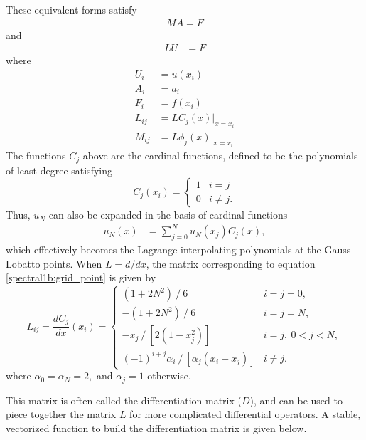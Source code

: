 These equivalent forms satisfy
\begin{align}
	MA = F \label{spectral1b:chebyshev_expansion}
\end{align}
and
\begin{align}
	LU &= F \label{spectral1b:grid_point}
\end{align}
where
\begin{align*}
	U_i &= u(x_i) \\
	A_i &= a_i \\
	F_i &= f(x_i) \\
	L_{ij} &= LC_j(x) \bigg |_{x=x_i} \\
	M_{ij} &= L\phi_j(x) \bigg |_{x=x_i}
\end{align*}
The functions $C_j$ above are the cardinal functions, defined to be the polynomials of least degree satisfying
\begin{equation*}
C_j(x_i) = \begin{cases} 1 & i=j \\ 0 & i \neq j.
   \end{cases}
\end{equation*}
Thus, $u_N$ can also be expanded in the basis of cardinal functions
\begin{align*}
	u_N(x) &= \sum_{j=0}^N u_N(x_j) C_j(x),
\end{align*}
which effectively becomes the Lagrange interpolating polynomials at the Gauss-Lobatto points.
When $L = d/dx$, the matrix corresponding to equation \eqref{spectral1b:grid_point} is given by
\begin{equation*}
L_{ij} = \frac{dC_j}{dx}(x_i) = 
	\begin{cases} 
		(1 + 2N^2) ~/~ 6 & i = j = 0, \\ 
		-(1 + 2N^2) ~/~ 6 & i = j = N, \\
		-x_j ~/~ [2(1 - x_j^2)] & i = j, ~ 0 < j < N, \\
		(-1)^{i+j}\alpha_i ~/~ [\alpha_j(x_i - x_j)] & i \neq j.
   \end{cases}
\end{equation*}
where $\alpha_0 = \alpha_N = 2,$ and $\alpha_j = 1$ otherwise.

This matrix is often called the differentiation matrix ($D$), and can be used to piece together the matrix $L$ for more complicated differential operators.
A stable, vectorized function to build the differentiation matrix is given below.

